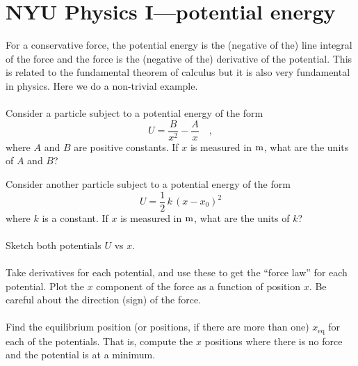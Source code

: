 \documentclass[12pt]{article}
\begin{document}
\section*{NYU Physics I---potential energy}

For a conservative force, the potential energy is the (negative of
the) line integral of the force and the force is the (negative of the)
derivative of the potential.  This is related to the fundamental
theorem of calculus but it is also very fundamental in physics.  Here
we do a non-trivial example.

\paragraph{\theproblem}%
Consider a particle subject to a potential energy of the form
\begin{equation}
U = \frac{B}{x^2} - \frac{A}{x} \quad ,
\label{eq:hard}
\end{equation}
where $A$ and $B$ are positive constants.  If $x$ is measured in $\mathrm{m}$,
what are the units of $A$ and $B$?

Consider another particle subject to a potential energy of the form
\begin{equation}
U = \frac{1}{2}\,k\,(x-x_0)^2
\label{eq:easy}
\end{equation}
where $k$ is a constant.  If $x$ is measured in $\mathrm{m}$, what are
the units of $k$?

\paragraph{\theproblem}%
Sketch both potentials $U$ vs $x$.

\paragraph{\theproblem}%
Take derivatives for each potential, and use these to get the ``force
law'' for each potential. Plot the $x$ component of the force as a
function of position $x$. Be careful about the direction (sign) of the
force.

\paragraph{\theproblem}%
Find the equilibrium position (or positions, if there are more than
one) $x_\mathrm{eq}$ for each of the potentials.  That is, compute the
$x$ positions where there is no force and the potential is at a
minimum.
\end{document}
